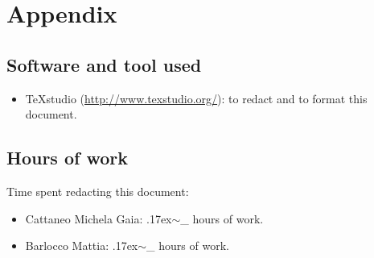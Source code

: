 \documentclass[18pt,oneside,a4paper, titlepage]{article}
\begin{document}
\newpage
\section{Appendix}

	\subsection{Software and tool used}
		\begin{itemize}
			\item TeXstudio (\url{http://www.texstudio.org/}): to redact and to format this document.
		\end{itemize}
	
	\subsection{Hours of work}
		Time spent redacting this document:
		\begin{itemize}
			\item Cattaneo Michela Gaia: {\raise.17ex\hbox{$\scriptstyle\sim$}}\_ hours of work.
			\item Barlocco Mattia: {\raise.17ex\hbox{$\scriptstyle\sim$}}\_ hours of work.
		\end{itemize}
\end{document}

